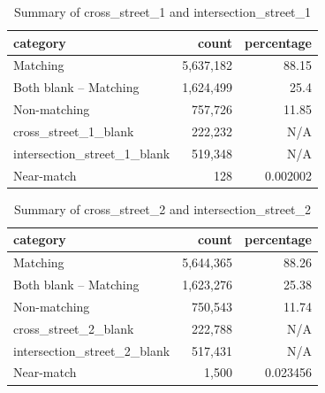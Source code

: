 \documentclass[12pt, titlepage]{article}
\begin{document}
\begin{table}[H]
    \centering
    \footnotesize
    \begin{tabular}{l r r}
        \toprule
        \textbf{category} & \textbf{count} & \textbf{percentage} \\
        \midrule
        Matching                    & 5,637,182 & 88.15     \\
        Both blank -- Matching      & 1,624,499 & 25.4      \\
        Non-matching                &   757,726 & 11.85     \\
        cross\_street\_1\_blank     &   222,232 & N/A       \\
        intersection\_street\_1\_blank &   519,348 & N/A       \\
        Near-match                  &       128 & 0.002002  \\
        \bottomrule
    \end{tabular}
    \caption{Summary of cross\_street\_1 and intersection\_street\_1}
    \label{tab:summary1}
\end{table}



\begin{table}[H]
    \centering
    \footnotesize
    \begin{tabular}{l r r}
        \toprule
        \textbf{category} & \textbf{count} & \textbf{percentage} \\
        \midrule
        Matching                    & 5,644,365 & 88.26     \\
        Both blank -- Matching      & 1,623,276 & 25.38     \\
        Non-matching                &   750,543 & 11.74     \\
        cross\_street\_2\_blank     &   222,788 & N/A       \\
        intersection\_street\_2\_blank &   517,431 & N/A       \\
        Near-match                  &     1,500 & 0.023456  \\
        \bottomrule
    \end{tabular}
    \caption{Summary of cross\_street\_2 and intersection\_street\_2}
    \label{tab:summary_cross_intersection_2}
\end{table}
\end{document}

